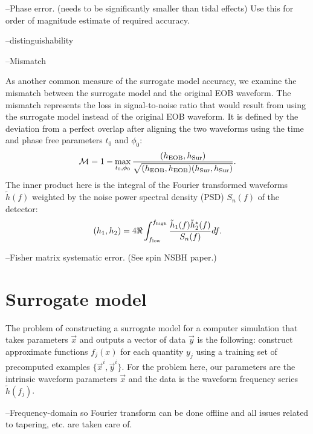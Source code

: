 \documentclass[prd,aps,letter,twocolumn,floatfix,notitlepage]{revtex4-1}
\begin{document}
--Phase error. (needs to be significantly smaller than tidal effects) Use this for order of magnitude estimate of required
accuracy.

--distinguishability

--Mismatch

As another common measure of the surrogate model accuracy, we examine the mismatch between 
the surrogate model and the original EOB waveform.
The mismatch represents the loss in signal-to-noise ratio that would result 
from using the surrogate model instead of the original EOB waveform. 
It is defined by the deviation from a perfect overlap after aligning the two waveforms
using the time and phase free parameters $t_0$ and $\phi_0$:
\begin{equation}
\mathcal{M} = 1 - \max_{t_0, \phi_0} \frac{(h_{\rm EOB}, h_{\rm Sur})} {\sqrt{(h_{\rm EOB}, h_{\rm EOB}) (h_{\rm Sur}, h_{\rm Sur})}}.
\end{equation}
The inner product here  is the integral of the Fourier transformed waveforms $\tilde h(f)$ weighted by the noise power spectral 
density (PSD) $S_n(f)$ of the detector:
\begin{equation}
(h_1, h_2) = 4 \Re \int_{f_{\rm low}}^{f_{\rm high}} \frac{\tilde h_1(f) \tilde h^*_2(f)} {S_n(f)} df.
\end{equation}

--Fisher matrix systematic error. (See spin NSBH paper.)

\section{Surrogate model}

The problem of constructing a surrogate model for a computer simulation that takes parameters 
$\vec x$ and outputs a vector of data $\vec y$ is the following: construct approximate functions $f_j(x)$
for each quantity $y_j$ using a training set of precomputed examples $\{\vec x^i, \vec y^i\}$. For the problem here, 
our parameters are the intrinsic waveform parameters $\vec x$ and the data is the waveform frequency series $\tilde h(f_j)$. 

--Frequency-domain so Fourier transform can be done offline and all issues related to tapering, etc. are taken care of.
\end{document}
